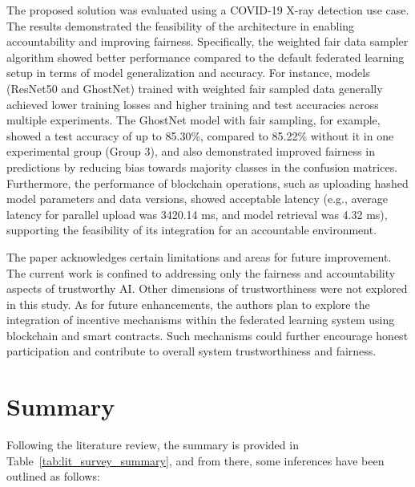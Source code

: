 The proposed solution was evaluated using a COVID-19 X-ray detection use case. The results demonstrated the feasibility of the architecture in enabling accountability and improving fairness. Specifically, the weighted fair data sampler algorithm showed better performance compared to the default federated learning setup in terms of model generalization and accuracy. For instance, models (ResNet50 and GhostNet) trained with weighted fair sampled data generally achieved lower training losses and higher training and test accuracies across multiple experiments. The GhostNet model with fair sampling, for example, showed a test accuracy of up to 85.30\%, compared to 85.22\% without it in one experimental group (Group 3), and also demonstrated improved fairness in predictions by reducing bias towards majority classes in the confusion matrices. Furthermore, the performance of blockchain operations, such as uploading hashed model parameters and data versions, showed acceptable latency (e.g., average latency for parallel upload was 3420.14 ms, and model retrieval was 4.32 ms), supporting the feasibility of its integration for an accountable environment.


The paper acknowledges certain limitations and areas for future improvement. The current work is confined to addressing only the fairness and accountability aspects of trustworthy AI. Other dimensions of trustworthiness were not explored in this study. As for future enhancements, the authors plan to explore the integration of incentive mechanisms within the federated learning system using blockchain and smart contracts. Such mechanisms could further encourage honest participation and contribute to overall system trustworthiness and fairness.



\section{Summary}

\label{sec:lit_survey_inferences}
Following the literature review, the summary is provided in Table~\ref{tab:lit_survey_summary}, and from there, some inferences have been outlined as follows:  

